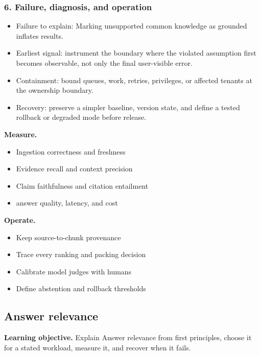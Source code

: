 \subsubsection*{6. Failure, diagnosis, and operation}
\begin{itemize}
\item Failure to explain: Marking unsupported common knowledge as grounded inflates results.
\item Earliest signal: instrument the boundary where the violated assumption first becomes observable, not only the final user-visible error.
\item Containment: bound queues, work, retries, privileges, or affected tenants at the ownership boundary.
\item Recovery: preserve a simpler baseline, version state, and define a tested rollback or degraded mode before release.
\end{itemize}
\textbf{Measure.}\begin{itemize}
\item Ingestion correctness and freshness
\item Evidence recall and context precision
\item Claim faithfulness and citation entailment
\item answer quality, latency, and cost
\end{itemize}
\textbf{Operate.}\begin{itemize}
\item Keep source-to-chunk provenance
\item Trace every ranking and packing decision
\item Calibrate model judges with humans
\item Define abstention and rollback thresholds
\end{itemize}
\subsection{Answer relevance}
\textbf{Learning objective.} Explain Answer relevance from first principles, choose it for a stated workload, measure it, and recover when it fails.
